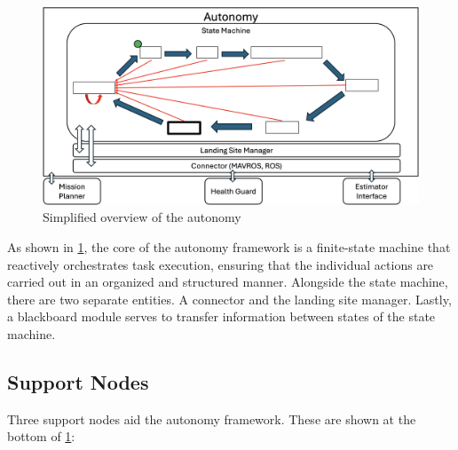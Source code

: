 \begin{figure}[ht!]
    \centering
    \includegraphics[scale=0.155]{images/system_overview/autonomy.png}
    \caption{Simplified overview of the autonomy}
    \label{fig:autonomy}
\end{figure}

As shown in \cref{fig:autonomy}, the core of the autonomy framework is a finite-state machine that reactively orchestrates task execution, ensuring that the individual actions are carried out in an organized and structured manner. Alongside the state machine, there are two separate entities. A connector and the landing site manager. Lastly, a blackboard module serves to transfer information between states of the state machine.

\subsection{Support Nodes}\label{subsec:sup_nodes}

Three support nodes aid the autonomy framework. These are shown at the bottom of \cref{fig:autonomy}:

